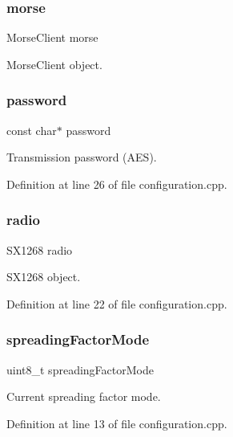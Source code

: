 \subsubsection{\texorpdfstring{morse}{morse}}
{\footnotesize\ttfamily Morse\+Client morse}

Morse\+Client object. \mbox{\label{group__defines__global__variables_gaa4a2ebcb494493f648ae1e6975672575}} 
\subsubsection{\texorpdfstring{password}{password}}
{\footnotesize\ttfamily const char$\ast$ password}

Transmission password (A\+ES). 

Definition at line 26 of file configuration.\+cpp.

\mbox{\label{group__defines__global__variables_ga4d67d9af4c43901b2f5171b55270e4f7}} 
\subsubsection{\texorpdfstring{radio}{radio}}
{\footnotesize\ttfamily S\+X1268 radio}

S\+X1268 object. 

Definition at line 22 of file configuration.\+cpp.

\mbox{\label{group__defines__global__variables_ga1b7f588d9dfbb3b5e8553ce78dacac8d}} 
\subsubsection{\texorpdfstring{spreading\+Factor\+Mode}{spreadingFactorMode}}
{\footnotesize\ttfamily uint8\+\_\+t spreading\+Factor\+Mode}

Current spreading factor mode. 

Definition at line 13 of file configuration.\+cpp.

